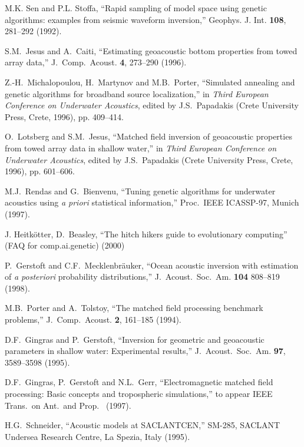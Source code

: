 \documentclass{saclantc}
\begin{document}
\begin{thebibliography}{11}
M.K. Sen and P.L. Stoffa,
``Rapid sampling of model space using genetic algorithms: examples from
  seismic waveform inversion,''
{ Geophys. J. Int.} {\bf 108}, 281--292 (1992).

S.M.\ Jesus and A.~Caiti,  ``Estimating geoacoustic bottom properties
from towed array data,'' {J.\ Comp.\ Acoust.} 
  {\bf 4}, 273--290 (1996).

Z.-H.\ Michalopoulou, H.\ Martynov and M.B.\ Porter,
``Simulated annealing and genetic algorithms for broadband source
localization,'' in 
{\it Third European Conference
on Underwater Acoustics}, 
edited by J.S.\ Papadakis (Crete University Press, Crete,
1996), pp. 409--414.

O.\ Lotsberg and S.M.\ Jesus,
``Matched field inversion of geoacoustic properties from towed array
data in shallow water,'' in {\it Third European Conference
on Underwater Acoustics}, 
edited by J.S.\ Papadakis (Crete University Press, Crete,
1996), pp. 601--606.

M.J.\ Rendas and G.\ Bienvenu,
``Tuning genetic algorithms for underwater acoustics using {\it a  priori}
statistical information,'' Proc.~IEEE ICASSP-97, Munich (1997).

J. Heitk\"otter, D.\ Beasley, ``The hitch hikers guide to evolutionary computing'' (FAQ for comp.ai.genetic) (2000)

 P.~Gerstoft and  C.F.\ Mecklenbr\"auker, ``Ocean acoustic
inversion with estimation of {\it a posteriori} probability distributions,''
{J.~Acoust.~Soc.~Am.}  {\bf 104 } 808--819 (1998).

M.B.~Porter and A.\ Tolstoy,  ``The matched field processing benchmark problems,'' {J.\ Comp.\ Acoust.} {\bf 2}, 161--185 (1994).

 D.F.\ Gingras and P.~Gerstoft, ``Inversion for geometric and geoacoustic 
parameters in shallow water: Experimental results,'' 
{J.\ Acoust.\ Soc.\ Am.} {\bf 97}, 3589--3598 (1995).

 D.F.~Gingras, P.~Gerstoft and N.L.~Gerr, ``Electromagnetic
matched field processing: Basic concepts and tropospheric
simulations,''   to appear {IEEE Trans.\ on
Ant.\ and Prop.\ }  (1997).

H.G.\ Schneider, ``Acoustic models at SACLANTCEN,'' 
SM-285, SACLANT Undersea Research Centre, La Spezia, Italy (1995).


\end{thebibliography}
\end{document}
